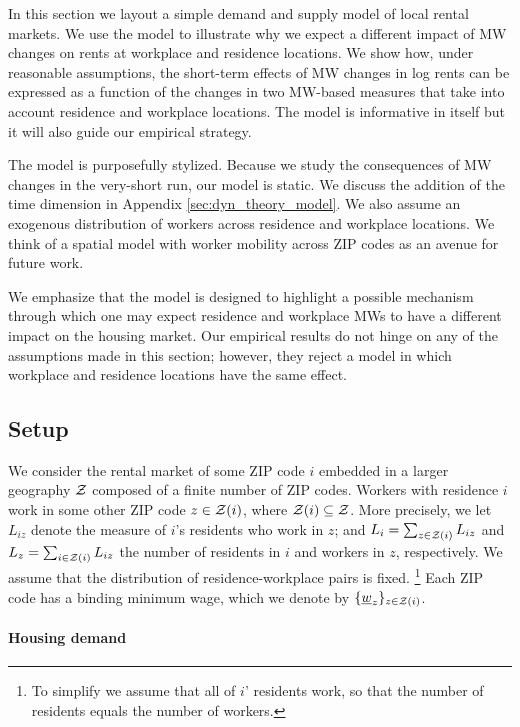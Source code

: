 
In this section we layout a simple demand and supply model of local rental markets.
We use the model to illustrate why we expect a different impact of MW changes 
on rents at workplace and residence locations.
We show how, under reasonable assumptions, the short-term effects of MW changes 
in log rents can be expressed as a function of the changes in two MW-based measures
that take into account residence and workplace locations.
The model is informative in itself but it will also guide our empirical strategy.

The model is purposefully stylized.
Because we study the consequences of MW changes in the very-short run, our model is 
static.
We discuss the addition of the time dimension in Appendix \ref{sec:dyn_theory_model}.
We also assume an exogenous distribution of workers across residence and workplace 
locations.
We think of a spatial model with worker mobility across ZIP codes as an avenue 
for future work.

We emphasize that the model is designed to highlight a possible mechanism through 
which one may expect residence and workplace MWs to have a different impact on the 
housing market.
Our empirical results do not hinge on any of the assumptions made in this section;
however, they reject a model in which workplace and residence locations have the 
same effect.

\subsection{Setup}

We consider the rental market of some ZIP code $i$ embedded in a larger geography 
$\mathcal{Z}$ composed of a finite number of ZIP codes.
Workers with residence $i$ work in some other ZIP code $z\in\mathcal{Z}(i)$, where 
$\mathcal{Z}(i)\subseteq\mathcal{Z}$.
More precisely, we let $L_{iz}$ denote the measure of $i$'s residents who work in 
$z$; and 
$L_i = \sum_{z \in \mathcal{Z}(i)} L_{iz}$ and $L_z = \sum_{i \in \mathcal{Z}(i)} L_{iz}$ the number
of residents in $i$ and workers in $z$, respectively.
We assume that the distribution of residence-workplace pairs is fixed.%
\footnote{To simplify we assume that all of $i$' residents work, so that the number
of residents equals the number of workers.}
Each ZIP code has a binding minimum wage, which we denote by $\{\underline{w}_z\}_{z\in\mathcal{Z}(i)}$.

\paragraph{Housing demand}

